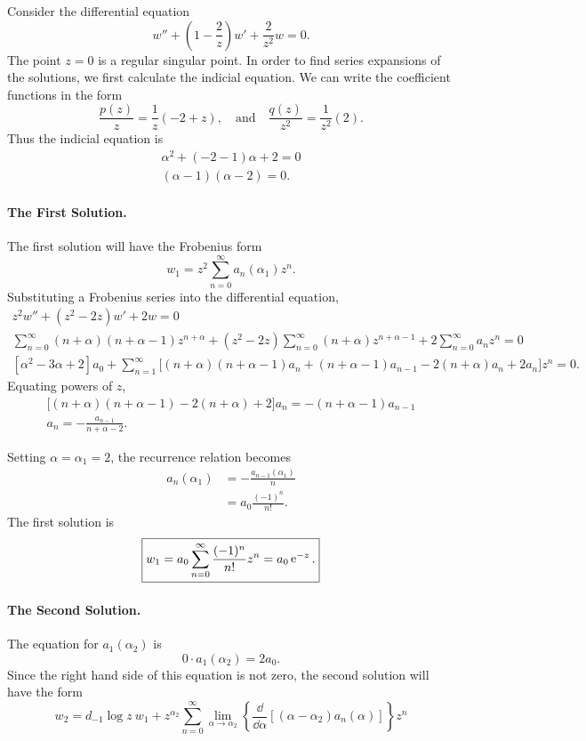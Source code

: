 \begin{Example}
  Consider the differential equation
  \[ w'' + \left(1 - \frac{2}{z} \right) w' + \frac{2}{z^2} w = 0. \]
  The point $z = 0$ is a regular singular point.  In order to find series
  expansions of the solutions, we first calculate the indicial equation.
  We can write the coefficient functions in the form
  \[ \frac{p(z)}{z} = \frac{1}{z}(-2 + z), \quad \mathrm{and} \quad
  \frac{q(z)}{z^2} = \frac{1}{z^2}(2). \]
  Thus the indicial equation is
  \begin{gather*}
    \alpha^2 + (-2-1)\alpha + 2 = 0 \\
    (\alpha-1)(\alpha-2) = 0.
  \end{gather*}

  \paragraph{The First Solution.}
  The first solution will have the Frobenius form
  \[ w_1 = z^2 \sum_{n=0}^\infty a_n(\alpha_1) z^n. \]
  Substituting a Frobenius series into the differential equation,
  \begin{gather*}
    z^2 w'' + (z^2 - 2z) w' + 2 w = 0 \\
    \sum_{n=0}^\infty (n + \alpha)(n + \alpha-1) z^{n+\alpha}
    + (z^2-2z) \sum_{n=0}^\infty (n+\alpha)z^{n+\alpha-1}
    + 2 \sum_{n=0}^\infty a_n z^n = 0 \\
    [\alpha^2 - 3 \alpha + 2]a_0 + \sum_{n=1}^\infty \Big[(n+\alpha)(n+\alpha-1)a_n 
    + (n + \alpha-1)a_{n-1}
    -2 (n+\alpha)a_n + 2a_n\Big] z^n = 0.
  \end{gather*}
  Equating powers of $z$,
  \begin{gather*}
    \Big[(n+\alpha)(n+\alpha-1)  -2 (n+\alpha) + 2\Big] a_n = - (n + \alpha-1)a_{n-1} \\
    a_n = - \frac{a_{n-1}}{n+\alpha-2} . 
  \end{gather*}

  Setting $\alpha = \alpha_1 = 2$, the recurrence relation becomes
  \begin{align*}
    a_n(\alpha_1) &= - \frac{a_{n-1}(\alpha_1)}{n} \\
    &= a_0 \frac{(-1)^n}{n!}. 
  \end{align*}
  The first solution is
  \[ \boxed{ w_1 = a_0 \sum_{n=0}^\infty \frac{(-1)^n}{n!} z^n 
    = a_0 \mathop{\mathrm{e}}\nolimits^{-z}.} \]

  \paragraph{The Second Solution.}
  The equation for $a_1(\alpha_2)$ is
  \[ 0 \cdot a_1(\alpha_2) = 2 a_0. \]
  Since the right hand side of this equation is not 
  zero, the second solution will
  have the form
  \[ w_2 = d_{-1} \log z\ w_1 + 
  z^{\alpha_2} \sum_{n=0}^\infty \lim_{\alpha \to \alpha_2} \left\{
    \frac{\dd}{\dd \alpha} [(\alpha-\alpha_2)a_n(\alpha)] \right\}z^n \]


\end{Example}
